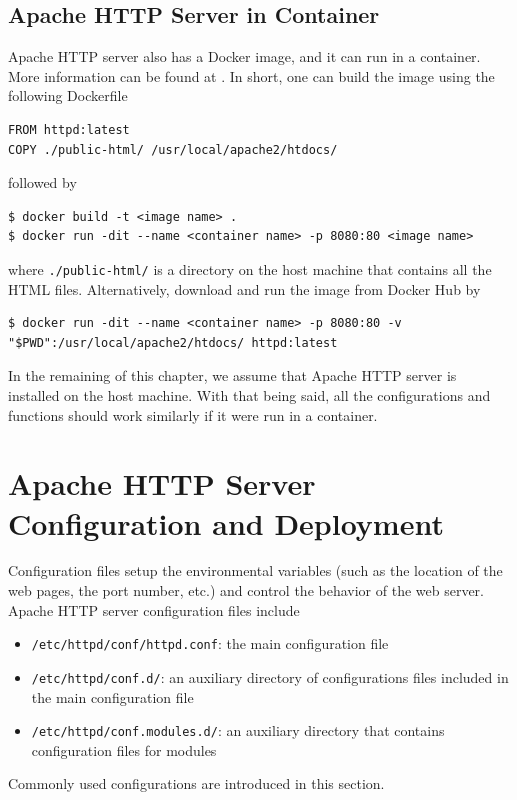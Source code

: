 \subsection{Apache HTTP Server in Container}

Apache HTTP server also has a Docker image, and it can run in a container. More information can be found at \cite{docker2024httpd}. In short, one can build the image using the following Dockerfile 
\begin{lstlisting}
FROM httpd:latest
COPY ./public-html/ /usr/local/apache2/htdocs/
\end{lstlisting}
followed by
\begin{lstlisting}
$ docker build -t <image name> .
$ docker run -dit --name <container name> -p 8080:80 <image name>
\end{lstlisting}
where \verb|./public-html/| is a directory on the host machine that contains all the HTML files. Alternatively, download and run the image from Docker Hub by
\begin{lstlisting}
$ docker run -dit --name <container name> -p 8080:80 -v "$PWD":/usr/local/apache2/htdocs/ httpd:latest
\end{lstlisting}

In the remaining of this chapter, we assume that Apache HTTP server is installed on the host machine. With that being said, all the configurations and functions should work similarly if it were run in a container.

\section{Apache HTTP Server Configuration and Deployment}

Configuration files setup the environmental variables (such as the location of the web pages, the port number, etc.) and control the behavior of the web server. Apache HTTP server configuration files include
\begin{itemize}
	\item \verb|/etc/httpd/conf/httpd.conf|: the main configuration file
	\item \verb|/etc/httpd/conf.d/|: an auxiliary directory of configurations files included in the main configuration file
	\item \verb|/etc/httpd/conf.modules.d/|: an auxiliary directory that contains configuration files for modules
\end{itemize}

Commonly used configurations are introduced in this section.

